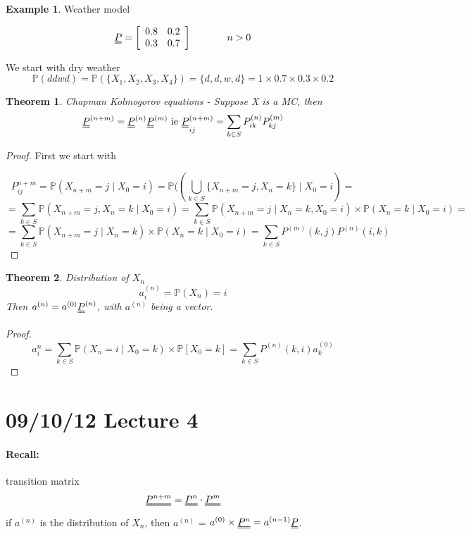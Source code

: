 \documentclass{article}
\newtheorem*{thm}{Theorem}
\theoremstyle{definition}
\newtheorem*{ex}{Example}
\begin{document}
\begin{ex} Weather model

\[
\uuline{P} = \left [ \begin{array}{cc} 0.8 & 0.2 \\ 0.3 & 0.7 \end{array} \right ] \hspace*{0.5 in} n > 0
\]

We start with dry weather 
\[
\mathbb{P}(ddwd) = \mathbb{P}(\{X_1, X_2, X_3,X_4\} ) = \{d,d,w,d\} = 1 \times 0.7 \times 0.3 \times 0.2
\] 
\end{ex}

\begin{thm} Chapman Kolmogorov equations -
Suppose X is a MC, then
\[
\uuline{P}^{(n + m)} = \uuline{P}^{(n)} \uuline{P}^{(m)} \mbox{ ie } \uuline{P}_{ij}^{(n+m)} = \sum_{k \in S} P_{ik}^{(n)} P_{kj}^{(m)}
\]
\end{thm}

\begin{proof} First we start with

\[
P_{ij}^{n+m} = \mathbb{P}(X_{n+m} = j \mid X_0 = i )= \mathbb{P}((\bigcup_{k \in S} \{ X_{n+m} = j, X_n = k \} \mid X_0 = i) =
\]
\[ = \sum_{k \in S} \mathbb{P}(X_{n+m} = j, X_n = k \mid X_0 = i) = \sum_{k \in S} \mathbb{P}(X_{n+m} = j \mid X_n = k, X_0 = i ) \times \mathbb{P} (X_n = k \mid X_0 = i) = 
\]
\[ = \sum_{k \in S} \mathbb{P} (X_{n+m} = j \mid X_n = k) \times \mathbb{P}(X_n = k \mid X_0 = i) = \sum_{k \in S} P^{(m)}(k,j) P^{(n)}(i,k)
\]
\end{proof}

\begin{thm} Distribution of $X_n$
\[
a_i^{(n)} = \mathbb{P}(X_n) = i
\]
Then $a^{(n)} = a^{(0)} \uuline{P}^{(n)}$, with $a^{(n)}$ being a vector.
\end{thm}

\begin{proof}
\[
a_i^n = \sum_{k \in S} \mathbb{P} (X_n = i \mid X_0 = k ) \times \mathbb{P}[X_0 = k] = \sum_{k \in S} P^{(n)} (k,i) a_k^{(0)}
\] 
\end{proof}

\section*{09/10/12 Lecture 4}

\paragraph*{Recall:} transition matrix
\[
\uuline{P^{n+m}} = \uuline{P^{n}} \cdot \uuline{P^{m}} 
\]
if $a^{(n)}$ is the distribution of $X_n$, then $a^{(n)}$ = $a^{(0)} \times \uuline{P^{n}} = a^{(n-1)}\uuline{P}$.
\end{document}
